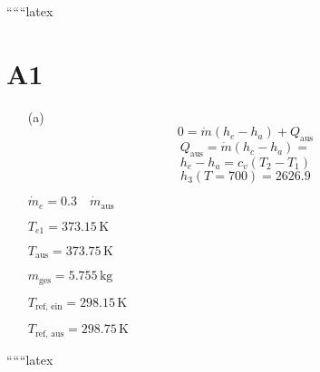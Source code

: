 
``````latex


\section*{A1}

\begin{itemize}
    \item[(a)] 
    \begin{equation*}
        0 = \dot{m} (h_e - h_a) + Q_{\text{aus}}
    \end{equation*}
    \begin{equation*}
        Q_{\text{aus}} = \dot{m} (h_c - h_a) = 
    \end{equation*}
    \begin{equation*}
        h_e - h_a = c_v (T_2 - T_1)
    \end{equation*}
    \begin{equation*}
        h_3 (T = 700) = 2626.9
    \end{equation*}
\end{itemize}

\begin{itemize}
    \item[$\dot{m}_e = 0.3 \quad \dot{m}_{\text{aus}}$]
    \item[$T_{e1} = 373.15 \, \text{K}$]
    \item[$T_{\text{aus}} = 373.75 \, \text{K}$]
    \item[$m_{\text{ges}} = 5.755 \, \text{kg}$]
    \item[$T_{\text{ref, ein}} = 298.15 \, \text{K}$]
    \item[$T_{\text{ref, aus}} = 298.75 \, \text{K}$]
\end{itemize}

``````latex


